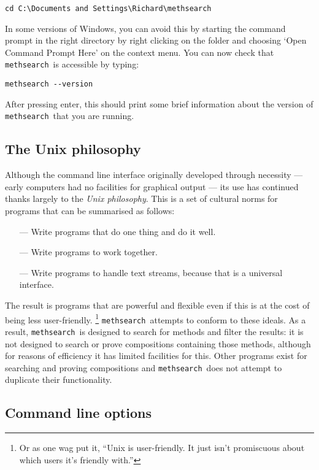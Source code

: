 \documentclass[a4paper,11pt,oneside]{book}
\makeatletter
\def\textitidx#1{\textit{#1}\index{#1}}
\newcommand{\oi}[1]{\index{#1@{\hspace*{-\optwidth}\texttt{-}\texttt{#1}}}}
\def\methsearch{\texttt{meth\-search}}
\makeatother
\begin{document}
\begin{Verbatim}
cd C:\Documents and Settings\Richard\methsearch
\end{Verbatim}

In some versions of Windows, you can avoid this by
starting the command prompt in the right
directory by right clicking on the folder and choosing 
`Open Command Prompt Here' on the context menu.
You can now check that \methsearch\ is accessible by typing:

\begin{Verbatim}
methsearch --version
\end{Verbatim}
\oi{V}

After pressing enter, this should print some brief information about the 
version of \methsearch\ that you are running.

\subsection{The Unix philosophy}\label{unixphil}

Although the command line interface originally developed through necessity
--- early computers had no facilities for graphical output --- its use
has continued thanks largely to the \textitidx{Unix philosophy}.  This is 
a set of cultural norms for programs that can be summarised as follows:

\begin{itemize}
\item[---] Write programs that do one thing and do it well.
\item[---] Write programs to work together. 
\item[---] Write programs to handle text streams, 
because that is a universal interface.
\end{itemize}

The result is programs that are powerful and flexible even if this is 
at the cost of being less user-friendly.%
\footnote{Or as one wag put it, ``Unix is user-friendly. 
It just isn't promiscuous about which users it's friendly with.''}
\methsearch\ attempts to conform to these ideals.  As a result,
\methsearch\ is designed to search for methods and filter the results:
it is not designed to search or prove compositions containing those methods,
although for reasons of efficiency it has limited facilities for this.
Other programs exist for searching and proving compositions and
\methsearch\ does not attempt to duplicate their functionality.

\subsection{Command line options}
\end{document}
